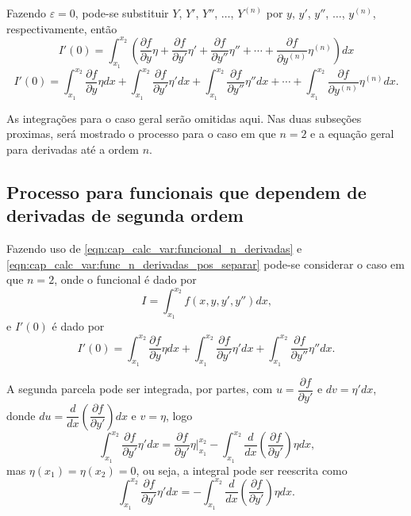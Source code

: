 \documentclass[
	12pt,				%
	openright,			%
    twoside,			%
	a4paper,			%
	chapter=TITLE,		%
	english,			%
	french,				%
	spanish,			%
	brazil				%
	]{abntex2}
\numberwithin{lema}{chapter}
\numberwithin{teorema}{chapter}
\numberwithin{definicao}{chapter}
\numberwithin{exemplo}{chapter}
\numberwithin{figure}{chapter}
\begin{document}
Fazendo $\varepsilon=0$, pode-se substituir $Y$, $Y'$, $Y''$, $\dots$, $Y^{(n)}$ por $y$, $y'$, $y''$, $\dots$, $y^{(n)}$, respectivamente, então
$$
	I'(0)= \int_{x_1}^{x_2} \left (
		\frac{\partial f}{\partial y} \eta
		+
		\frac{\partial f}{\partial y'} \eta'
		+
		\frac{\partial f}{\partial y''} \eta''
		+
		\cdots
		+
		\frac{\partial f}{\partial y^{(n)}} \eta^{(n)}
	\right )dx
$$
\begin{equation}
	\label{eqn:cap_calc_var:func_n_derivadas_pos_separar}
	I'(0)= 
	\int_{x_1}^{x_2}
		\frac{\partial f}{\partial y} \eta
	dx
	+		
	\int_{x_1}^{x_2}
		\frac{\partial f}{\partial y'} \eta'
	dx
	+
	\int_{x_1}^{x_2}
		\frac{\partial f}{\partial y''} \eta''
	dx
	+
	\cdots
	+
	\int_{x_1}^{x_2}
		\frac{\partial f}{\partial y^{(n)}} \eta^{(n)}
	dx
	\text{.}
\end{equation}

As integrações para o caso geral serão omitidas aqui. Nas duas subseções proximas, será mostrado o processo para o caso em que $n=2$ e a equação geral para derivadas até a ordem $n$.

\subsection{Processo para funcionais que dependem de derivadas de segunda ordem}

Fazendo uso de \eqref{eqn:cap_calc_var:funcional_n_derivadas} e \eqref{eqn:cap_calc_var:func_n_derivadas_pos_separar} pode-se considerar o caso em que $n=2$, onde o funcional é dado por
$$
	I=\int_{x_1}^{x_2} f(x, y, y', y'')dx
	\text{,}
$$
e $I'(0)$ é dado por
\begin{equation}
	\label{eqn:cap_calc_var:func_2_derivada_integracao}
	I'(0)=
	\int_{x_1}^{x_2}
		\frac{\partial f}{\partial y}
		\eta
	dx
	+
	\int_{x_1}^{x_2}
		\frac{\partial f}{\partial y'}
		\eta'
	dx
	+
	\int_{x_1}^{x_2}
		\frac{\partial f}{\partial y''}
		\eta''
	dx
	\text{.}
\end{equation}

A segunda parcela pode ser integrada, por partes, com $u=\dfrac{\partial f}{\partial y'}$ e $dv=\eta'dx$, donde 
$du=\dfrac{d}{dx} \left (
	\dfrac{\partial f}{\partial y'}
\right ) dx$ e $v=\eta$, logo
$$
	\int_{x_1}^{x_2} \frac{\partial f}{\partial y'}\eta ' dx
	=
	\frac{\partial f}{\partial y'}\eta \Big |_{x_1}^{x_2}
	-
	\int_{x_1}^{x_2}
		\frac{d}{dx} \left (
			\frac{\partial f}{\partial y'}
		\right ) \eta dx
	\text{,}
$$
mas $\eta(x_1)=\eta(x_2)=0$, ou seja, a integral pode ser reescrita como
\begin{equation}
	\label{eqn:cap_calc_var:func_2_derivadas_membro2}
	\int_{x_1}^{x_2} \frac{\partial f}{\partial y'}\eta ' dx
	=
	-
	\int_{x_1}^{x_2}
		\frac{d}{dx} \left (
			\frac{\partial f}{\partial y'}
		\right ) \eta dx
	\text{.}
\end{equation}
\end{document}
